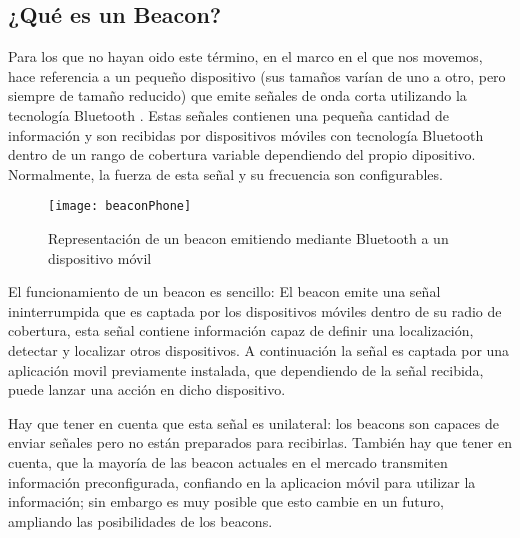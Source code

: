 \begin{figure}[!h]
        \begin{floatrow}
        \end{floatrow}
\end{figure}

\subsection{¿Qué es un Beacon?}

Para los que no hayan oido este término, en el marco en el que nos movemos, hace referencia a un pequeño dispositivo (sus tamaños varían de uno a otro, pero siempre de tamaño reducido) que emite señales de onda corta utilizando la tecnología Bluetooth \cite{URL::Bluetooth}. Estas señales contienen una pequeña cantidad de información y son recibidas por dispositivos móviles con tecnología Bluetooth dentro de un rango de cobertura variable dependiendo del propio dipositivo. Normalmente, la fuerza de esta señal y su frecuencia son configurables.

\begin{figure}[h]
	\centering
	\texttt{[image: beaconPhone]}
	\caption{Representación de un beacon emitiendo mediante Bluetooth a un dispositivo móvil}
	\label{fig:beaconBluetooth}
\end{figure}

El funcionamiento de un beacon es sencillo: El beacon emite una señal ininterrumpida que es captada por los dispositivos móviles dentro de su radio de cobertura, esta señal contiene información capaz de definir una localización, detectar y localizar otros dispositivos. A continuación la señal es captada por una aplicación movil previamente instalada, que dependiendo de la señal recibida, puede lanzar una acción en dicho dispositivo.


Hay que tener en cuenta que esta señal es unilateral: los beacons son capaces de enviar señales pero no están preparados para recibirlas. También hay que tener en cuenta, que la mayoría de las beacon actuales en el mercado transmiten información preconfigurada, confiando en la aplicacion móvil para utilizar la información; sin embargo es muy posible que esto cambie en un futuro, ampliando las posibilidades de los beacons.

